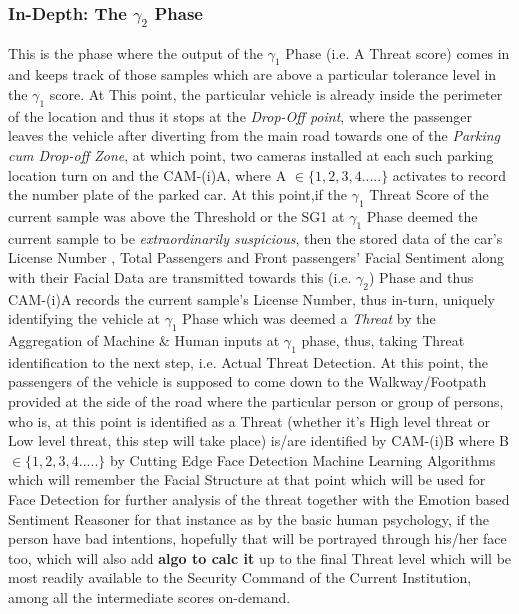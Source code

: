 \documentclass[a4paper,11pt]{article}
\begin{document}
\subsubsection{In-Depth: The $\gamma_2$ Phase}
This is the phase where the output of the $\gamma_1$ Phase (i.e. A Threat score) comes in and keeps track of those samples which are above a particular tolerance level in the $\gamma_1$ score.\newline
\newline
At This point, the particular vehicle is already inside the perimeter of the location and thus it stops at the \textit{Drop-Off point}, where the passenger leaves the vehicle after diverting from the main road towards one of the \textit{Parking cum Drop-off Zone}, at which point, two cameras installed at each such parking location turn on and the CAM-(i)A, where A $\in \{1,2,3,4.....\}$ activates to record the number plate of the parked car. \textbf{\cite{LP camera}}
\newline\newline
At this point,if the $\gamma_1$ Threat Score of the current sample was above the Threshold or the SG1 at $\gamma_1$ Phase deemed the current sample to be \textit{extraordinarily suspicious}, then the stored data of the car's License Number , Total Passengers and Front passengers' Facial Sentiment along with their Facial Data are transmitted towards this (i.e. $\gamma_2$) Phase and thus CAM-(i)A records the current sample's License Number, thus in-turn, uniquely identifying the vehicle at $\gamma_1$ Phase which was deemed a \textit{Threat} by the Aggregation of Machine \& Human inputs at $\gamma_1$ phase, thus, taking Threat identification to the next step, i.e. Actual Threat Detection.
\newline\newline
At this point, the passengers of the vehicle is supposed to come down to the Walkway/Footpath provided at the side of the road where the particular person or group of persons, who is, at this point is identified as a Threat (whether it's %
High level threat or Low level threat, this step will take place) is/are identified by CAM-(i)B where B $\in \{1,2,3,4.....\}$ by Cutting Edge Face Detection Machine Learning Algorithms \textbf{\cite{FaceFirst Platform}} which will remember the Facial Structure at that point which will be used for Face Detection for further analysis of the threat together with the Emotion based Sentiment Reasoner for that instance as by the basic human psychology, if the person have bad intentions, hopefully that will be portrayed through his/her face too, which will also add \textbf{algo to calc it} up to the final Threat level which will be most readily available to the Security Command of the Current Institution, among all the intermediate scores on-demand.\newline\newline
\end{document}
